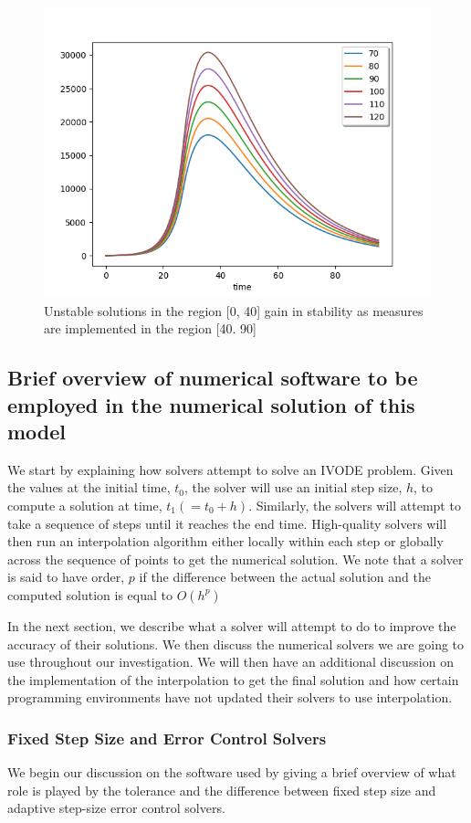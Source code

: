 \begin{figure}[h]
\centering
\includegraphics[width=0.7\linewidth]{./figures/regain_stability_after_measures}
\caption{Unstable solutions in the region [0, 40] gain in stability as measures are implemented in the region [40. 90]}
\label{fig:regain_stability_after_measures}
\end{figure}

\subsection{Brief overview of numerical software to be employed in the numerical solution of this model}
We start by explaining how solvers attempt to solve an IVODE problem. Given the values at the initial time, $t_0$, the solver will use an initial step size, $h$, to compute a solution at time, $t_1 (= t_0 + h)$. Similarly, the solvers will attempt to take a sequence of steps until it reaches the end time. High-quality solvers will then run an interpolation algorithm either locally within each step or globally across the sequence of points to get the numerical solution. We note that a solver is said to have order, $p$ if the difference between the actual solution and the computed solution is equal to $O(h^p)$

In the next section, we describe what a solver will attempt to do to improve the accuracy of their solutions. We then discuss the numerical solvers we are going to use throughout our investigation. We will then have an additional discussion on the implementation of the interpolation to get the final solution and how certain programming environments have not updated their solvers to use interpolation.

\subsubsection{Fixed Step Size and Error Control Solvers}
\label{subsection:fixed_vs_control}
We begin our discussion on the software used by giving a brief overview of what role is played by the tolerance and the difference between fixed step size and adaptive step-size error control solvers.

